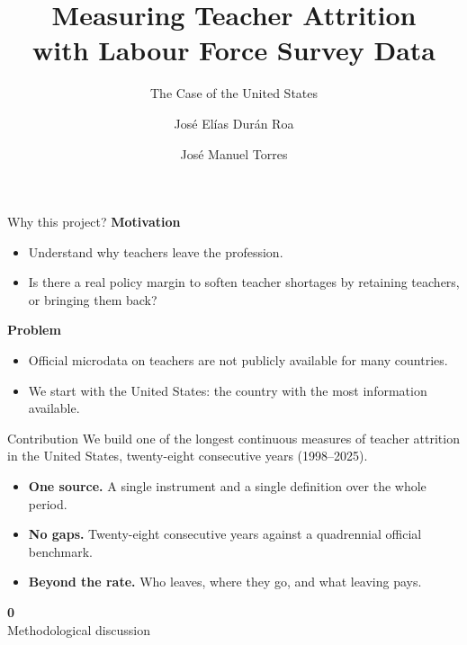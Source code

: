 \documentclass[aspectratio=169,11pt]{beamer}
\title{Measuring Teacher Attrition\\ with Labour Force Survey Data}
\subtitle{The Case of the United States}
\author{Jos\'e El\'ias Dur\'an Roa \and Jos\'e Manuel Torres}
\institute{Directorate for Education and Skills}
\date{}
\newcommand{\divframe}[2]{\begin{frame}[plain]\begin{center}%
{\color{navy}\fontsize{44}{44}\selectfont\bfseries #1}\\[0.9em]%
{\color{ink}\LARGE #2}\end{center}\end{frame}}
\newcommand{\appbtn}[2]{\hyperlink{#1<1>}{\beamergotobutton{#2}}}
\begin{document}
\begin{frame}
  \titlepage
\end{frame}

\begin{frame}[label=mainmot]{Why this project?}
  \vspace{0.8em}
  {\color{navy}\bfseries Motivation}\\[0.5em]
  \begin{itemize}\setlength\itemsep{0.6em}
    \item Understand why teachers leave the profession.
    \item Is there a real policy margin to soften teacher shortages by
          retaining teachers, or bringing them back?
  \end{itemize}
  \vspace{1.2em}
  {\color{navy}\bfseries Problem}\\[0.5em]
  \begin{itemize}\setlength\itemsep{0.6em}
    \item Official microdata on teachers are not publicly available for
          many countries.
    \item We start with the United States: the country with the most
          information available.
  \end{itemize}
  \vfill
  \appbtn{appsources}{official sources}
\end{frame}

\begin{frame}{Contribution}
  \vspace{0.6em}
  We build one of the longest continuous measures of teacher attrition
  in the United States, twenty-eight consecutive years (1998--2025).
  \vspace{0.8em}
  \begin{itemize}\setlength\itemsep{1.0em}
    \item {\color{navy}\bfseries One source.} A single instrument and
          a single definition over the whole period.
    \item {\color{navy}\bfseries No gaps.} Twenty-eight consecutive
          years against a quadrennial official benchmark.
    \item {\color{navy}\bfseries Beyond the rate.} Who leaves, where
          they go, and what leaving pays.
  \end{itemize}
\end{frame}

\divframe{0}{Methodological discussion}
\end{document}
